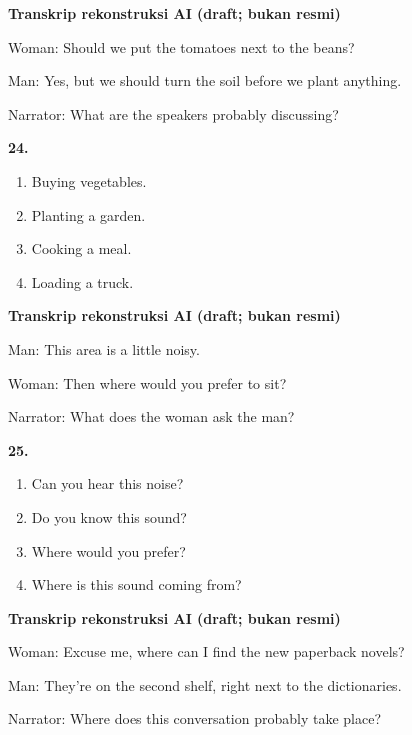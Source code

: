 \documentclass[12pt]{article}
\begin{document}
\par
\vspace{0.25\baselineskip}
\begin{exampleblock}
\textbf{Transkrip rekonstruksi AI (draft; bukan resmi)}\par
Woman: Should we put the tomatoes next to the beans?\par
Man: Yes, but we should turn the soil before we plant anything.\par
Narrator: What are the speakers probably discussing?\par
\end{exampleblock}
\noindent\textbf{24.}
\begin{enumerate}[label=(\Alph*),leftmargin=*,itemsep=0.2em]
\item Buying vegetables.
\item Planting a garden.
\item Cooking a meal.
\item Loading a truck.
\end{enumerate}
\par
\vspace{0.25\baselineskip}
\begin{exampleblock}
\textbf{Transkrip rekonstruksi AI (draft; bukan resmi)}\par
Man: This area is a little noisy.\par
Woman: Then where would you prefer to sit?\par
Narrator: What does the woman ask the man?\par
\end{exampleblock}
\noindent\textbf{25.}
\begin{enumerate}[label=(\Alph*),leftmargin=*,itemsep=0.2em]
\item Can you hear this noise?
\item Do you know this sound?
\item Where would you prefer?
\item Where is this sound coming from?
\end{enumerate}
\par
\vspace{0.25\baselineskip}
\begin{exampleblock}
\textbf{Transkrip rekonstruksi AI (draft; bukan resmi)}\par
Woman: Excuse me, where can I find the new paperback novels?\par
Man: They're on the second shelf, right next to the dictionaries.\par
Narrator: Where does this conversation probably take place?\par
\end{exampleblock}
\end{document}
